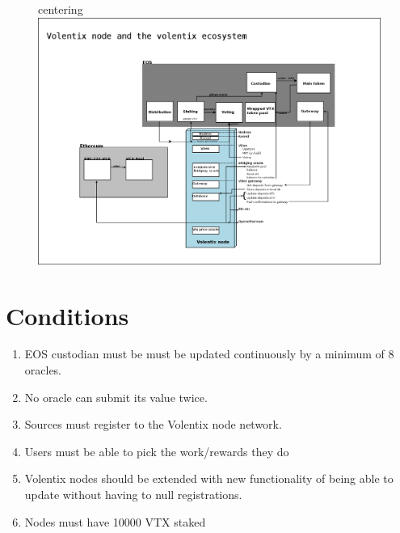 \documentclass[]{article}
\begin{document}
\begin{figure}
	centering
	\includegraphics[scale=0.2]{vltxnode.png}
	\caption{}
	\label{fig:whitebackground-ecosystem02}
\end{figure}

\section{Conditions}
\begin{enumerate}
	\item EOS custodian must be  must be updated continuously by a minimum of 8 oracles.
	\item No oracle can submit its value twice. 
	\item Sources must register to the Volentix node network.
	\item Users must be able to pick the work/rewards they do
	\item Volentix nodes should be extended with new functionality of being able to update  without having to null registrations.
	\item Nodes must have 10000 VTX staked 	

\end{enumerate}
\end{document}
